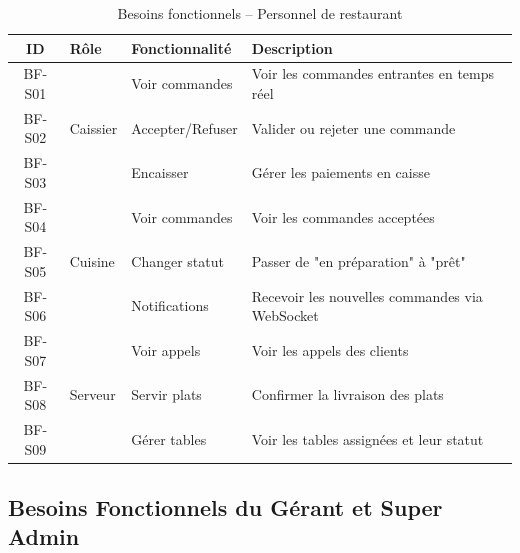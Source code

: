 \documentclass[12pt,a4paper]{report}
\begin{document}
\begin{table}[H]
    \centering
    \begin{tabularx}{\textwidth}{c l l X}
        \toprule
        \rowcolor{secondary!10}
        \textbf{ID} & \textbf{Rôle} & \textbf{Fonctionnalité} & \textbf{Description} \\
        \midrule
        BF-S01 & \multirow{3}{*}{Caissier} & Voir commandes & Voir les commandes entrantes en temps réel \\
        BF-S02 & & Accepter/Refuser & Valider ou rejeter une commande \\
        BF-S03 & & Encaisser & Gérer les paiements en caisse \\
        \midrule
        BF-S04 & \multirow{3}{*}{Cuisine} & Voir commandes & Voir les commandes acceptées \\
        BF-S05 & & Changer statut & Passer de "en préparation" à "prêt" \\
        BF-S06 & & Notifications & Recevoir les nouvelles commandes via WebSocket \\
        \midrule
        BF-S07 & \multirow{3}{*}{Serveur} & Voir appels & Voir les appels des clients \\
        BF-S08 & & Servir plats & Confirmer la livraison des plats \\
        BF-S09 & & Gérer tables & Voir les tables assignées et leur statut \\
        \bottomrule
    \end{tabularx}
    \caption{Besoins fonctionnels -- Personnel de restaurant}
    \label{tab:bf-staff}
\end{table}

\subsection{Besoins Fonctionnels du Gérant et Super Admin}
\end{document}
